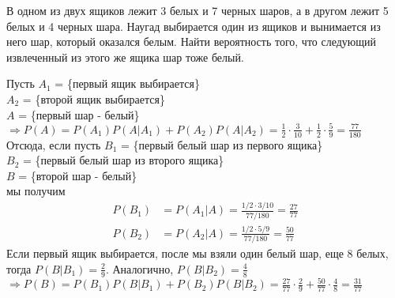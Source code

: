 \begin{exercise}[4] В одном из двух ящиков лежит  3  белых и  7  черных шаров, а в другом лежит 5  белых  и   4   черных шара. Наугад выбирается один из ящиков и вынимается из него шар, который оказался белым. Найти вероятность того, что следующий извлеченный из этого же ящика шар тоже белый.

Пусть $A_1$ = \{первый ящик выбирается\} \\ $A_2$ = \{второй ящик выбирается\} \\ $A$ = \{первый шар - белый\} \\ $\Rightarrow P(A) = P(A_1) P(A | A_1) + P(A_2) P(A | A_2) = \frac{1}{2} \cdot \frac{3}{10} + \frac{1}{2} \cdot \frac{5}{9} = \frac{77}{180}$ \\ Отсюда, если пусть $B_1$ = \{первый белый шар из первого ящика\} \\ $B_2$ = \{первый белый шар из второго ящика\} \\ $B$ = \{второй шар - белый\} \\ мы получим
\begin{align*}
	P(B_1) & = P(A_1 | A) = \frac{1/2 \cdot 3/10}{77/180} = \frac{27}{77} \\ P(B_2) & = P(A_2 | A) = \frac{1/2 \cdot 5/9}{77/180} = \frac{50}{77}
\end{align*}
Если первый ящик выбирается, после мы взяли один белый шар, еще 8 белых, тогда $P(B | B_1) = \frac{2}{9}$. Аналогично, $P(B | B_2) = \frac{4}{8}$ \\ $\Rightarrow P(B) = P(B_1) P(B | B_1) + P(B_2) P(B | B_2) = \frac{27}{77} \cdot \frac{2}{9} + \frac{50}{77} \cdot \frac{4}{8} = \frac{31}{77}$
\end{exercise}

